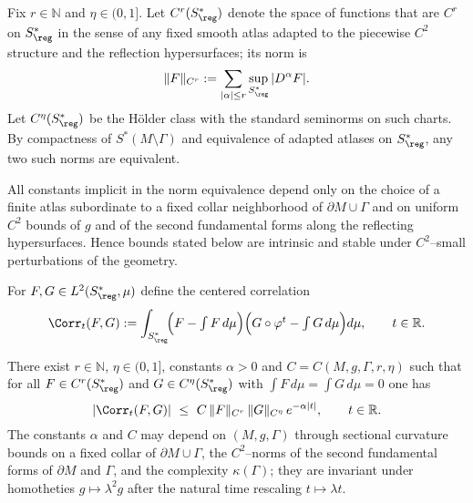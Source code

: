 \begin{hypothesis}
\begin{definition}\label{def:admissible}
Fix $r\in\mathbb{N}$ and $\eta\in(0,1]$.
Let $C^r(S^*_{\reg})$ denote the space of functions that are $C^r$ on $S^*_{\reg}$ in the sense of any fixed smooth atlas adapted to the piecewise $C^2$ structure and the reflection hypersurfaces; its norm is
\[
\|F\|_{C^r}:=\sum_{|\alpha|\le r}\sup_{S^*_{\reg}}|D^\alpha F|.
\]
Let $C^\eta(S^*_{\reg})$ be the Hölder class with the standard seminorms on such charts.
By compactness of $S^*(M\setminus\Gamma)$ and equivalence of adapted atlases on $S^*_{\reg}$, any two such norms are equivalent.
\end{definition}

\begin{remark}\label{rem:chart-independence}
All constants implicit in the norm equivalence depend only on the choice of a finite atlas subordinate to a fixed collar neighborhood of $\partial M\cup\Gamma$ and on uniform $C^2$ bounds of $g$ and of the second fundamental forms along the reflecting hypersurfaces.
Hence bounds stated below are intrinsic and stable under $C^2$–small perturbations of the geometry.
\end{remark}

\begin{definition}\label{def:correlation}
For $F,G\in L^2(S^*_{\reg},\mu)$ define the centered correlation
\[
\Corr_t(F,G):=\int_{S^*_{\reg}}\!\!\Big(F-\textstyle\int F\,d\mu\Big)\Big(G\circ\varphi^t-\textstyle\int G\,d\mu\Big)d\mu,
\qquad t\in\mathbb{R}.
\]
\end{definition}

\begin{hypothesis}\label{hyp:mixing-hermetic}
There exist $r\in\mathbb{N}$, $\eta\in(0,1]$, constants $\alpha>0$ and $C=C(M,g,\Gamma,r,\eta)$ such that for all $F\in C^r(S^*_{\reg})$ and $G\in C^\eta(S^*_{\reg})$ with $\int F\,d\mu=\int G\,d\mu=0$ one has
\[
|\Corr_t(F,G)|\ \le\ C\,\|F\|_{C^r}\,\|G\|_{C^\eta}\,e^{-\alpha |t|},\qquad t\in\mathbb{R}.
\]
The constants $\alpha$ and $C$ may depend on $(M,g,\Gamma)$ through sectional curvature bounds on a fixed collar of $\partial M\cup\Gamma$, the $C^2$–norms of the second fundamental forms of $\partial M$ and $\Gamma$, and the complexity $\kappa(\Gamma)$; they are invariant under homotheties $g\mapsto \lambda^2 g$ after the natural time rescaling $t\mapsto \lambda t$.
\end{hypothesis}


\end{hypothesis}

